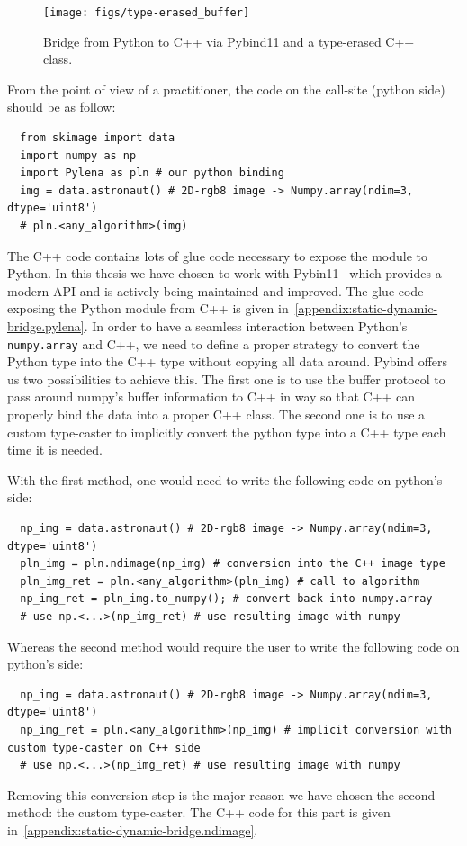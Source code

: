 \begin{figure}[htbp]
  \centering
  \texttt{[image: figs/type-erased\_buffer]}
  \caption{Bridge from Python to C++ via Pybind11 and a type-erased C++ class.}
  \label{fig:type-erased.buffer}
\end{figure}

From the point of view of a practitioner, the code on the call-site (python side) should be as follow:
\begin{verbatim}
  from skimage import data
  import numpy as np
  import Pylena as pln # our python binding
  img = data.astronaut() # 2D-rgb8 image -> Numpy.array(ndim=3, dtype='uint8')
  # pln.<any_algorithm>(img)
\end{verbatim}

The C++ code contains lots of glue code necessary to expose the module to Python. In this thesis we have chosen to work
with Pybin11~\parencite{jakob.2017.pybind11} which provides a modern API and is actively being maintained and improved.
The glue code exposing the Python module from C++ is given in~\cref{appendix:static-dynamic-bridge.pylena}. In order to
have a seamless interaction between Python's \texttt{numpy.array} and C++, we need to define a proper strategy to
convert the Python type into the C++ type without copying all data around. Pybind offers us two possibilities to achieve
this. The first one is to use the buffer protocol to pass around numpy's buffer information to C++ in way so that C++
can properly bind the data into a proper C++ class. The second one is to use a custom type-caster to implicitly convert the python type
into a C++ type each time it is needed.

With the first method, one would need to write the following code on python's side:
\begin{verbatim}
  np_img = data.astronaut() # 2D-rgb8 image -> Numpy.array(ndim=3, dtype='uint8')
  pln_img = pln.ndimage(np_img) # conversion into the C++ image type
  pln_img_ret = pln.<any_algorithm>(pln_img) # call to algorithm
  np_img_ret = pln_img.to_numpy(); # convert back into numpy.array
  # use np.<...>(np_img_ret) # use resulting image with numpy
\end{verbatim}
Whereas the second method would require the user to write the following code on python's side:
\begin{verbatim}
  np_img = data.astronaut() # 2D-rgb8 image -> Numpy.array(ndim=3, dtype='uint8')
  np_img_ret = pln.<any_algorithm>(np_img) # implicit conversion with custom type-caster on C++ side
  # use np.<...>(np_img_ret) # use resulting image with numpy
\end{verbatim}
Removing this conversion step is the major reason we have chosen the second method: the custom type-caster. The C++ code
for this part is given in~\cref{appendix:static-dynamic-bridge.ndimage}.

